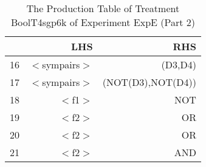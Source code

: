 \begin{table}[ht]
\centering
\begin{tabular}{rrr}
  \hline
 & LHS & RHS \\ 
  \hline
16 & $<$sympairs$>$ & (D3,D4) \\ 
  17 & $<$sympairs$>$ & (NOT(D3),NOT(D4)) \\ 
  18 & $<$f1$>$ & NOT \\ 
  19 & $<$f2$>$ & OR \\ 
  20 & $<$f2$>$ & OR \\ 
  21 & $<$f2$>$ & AND \\ 
   \hline
\end{tabular}
\caption{The Production Table of Treatment BoolT4sgp6k of Experiment ExpE (Part 2)} 
\end{table}
